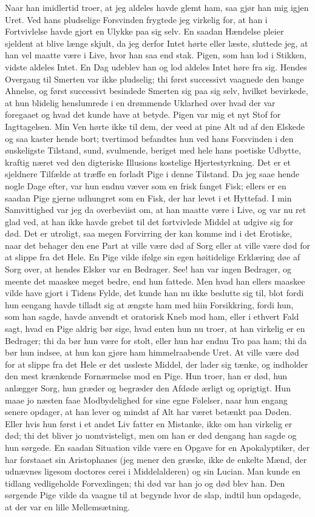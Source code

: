 \documentclass[12pt,a4paper]{article}
\begin{document}
Naar han imidlertid troer, at jeg aldeles havde glemt ham, saa gjør han mig igjen Uret. Ved hans pludselige Forsvinden frygtede jeg virkelig for, at han i Fortvivlelse havde gjort en Ulykke paa sig selv. En saadan Hændelse pleier sjeldent at blive længe skjult, da jeg derfor Intet hørte eller læste, sluttede jeg, at han vel maatte være i Live, hvor han saa end stak. Pigen, som han lod i Stikken, vidste aldeles Intet. En Dag udeblev han og lod aldeles Intet høre fra sig. Hendes Overgang til Smerten var ikke pludselig; thi først successivt vaagnede den bange Ahnelse, og først successivt besindede Smerten sig paa sig selv, hvilket bevirkede, at hun blidelig henslumrede i en drømmende Uklarhed over hvad der var foregaaet og hvad det kunde have at betyde. Pigen var mig et nyt Stof for Iagttagelsen. Min Ven hørte ikke til dem, der veed at pine Alt ud af den Elskede og saa kaster hende bort; tvertimod befandtes hun ved hans Forsvinden i den ønskeligste Tilstand, sund, svulmende, beriget med hele hans poetiske Udbytte, kraftig næret ved den digteriske Illusions kostelige Hjertestyrkning. Det er et sjeldnere Tilfælde at træffe en forladt Pige i denne Tilstand. Da jeg saae hende nogle Dage efter, var hun endnu væver som en frisk fanget Fisk; ellers er en saadan Pige gjerne udhungret som en Fisk, der har levet i et Hyttefad. I min Samvittighed var jeg da overbeviist om, at han maatte være i Live, og var nu ret glad ved, at han ikke havde grebet til det fortvivlede Middel at udgive sig for død. Det er utroligt, saa megen Forvirring der kan komme ind i det Erotiske, naar det behager den ene Part at ville være død af Sorg eller at ville være død for at slippe fra det Hele. En Pige vilde ifølge sin egen høitidelige Erklæring døe af Sorg over, at hendes Elsker var en Bedrager. See! han var ingen Bedrager, og meente det maaskee meget bedre, end hun fattede. Men hvad han ellers maaskee vilde have gjort i Tidens Fylde, det kunde han nu ikke beslutte sig til, blot fordi hun eengang havde tilladt sig at ængste ham med hiin Forsikkring, fordi hun, som han sagde, havde anvendt et oratorisk Kneb mod ham, eller i ethvert Fald sagt, hvad en Pige aldrig bør sige, hvad enten hun nu troer, at han virkelig er en Bedrager; thi da bør hun være for stolt, eller hun har endnu Tro paa ham; thi da bør hun indsee, at hun kan gjøre ham himmelraabende Uret. At ville være død for at slippe fra det Hele er det ussleste Middel, der lader sig tænke, og indholder den mest krænkende Fornærmelse mod en Pige. Hun troer, han er død, hun anlægger Sorg, hun græder og begræder den Afdøde ærligt og oprigtigt. Hun maae jo næsten faae Modbydelighed for sine egne Følelser, naar hun engang senere opdager, at han lever og mindst af Alt har været betænkt paa Døden. Eller hvis hun først i et andet Liv fatter en Mistanke, ikke om han virkelig er død; thi det bliver jo uomtvisteligt, men om han er død dengang han sagde og hun sørgede. En saadan Situation vilde være en Opgave for en Apokalyptiker, der har forstaaet sin Aristophanes (jeg mener den græske, ikke de enkelte Mænd, der udnævnes ligesom doctores cerei i Middelalderen) og sin Lucian. Man kunde en tidlang vedligeholde Forvexlingen; thi død var han jo og død blev han. Den sørgende Pige vilde da vaagne til at begynde hvor de slap, indtil hun opdagede, at der var en lille Mellemsætning.
\end{document}
